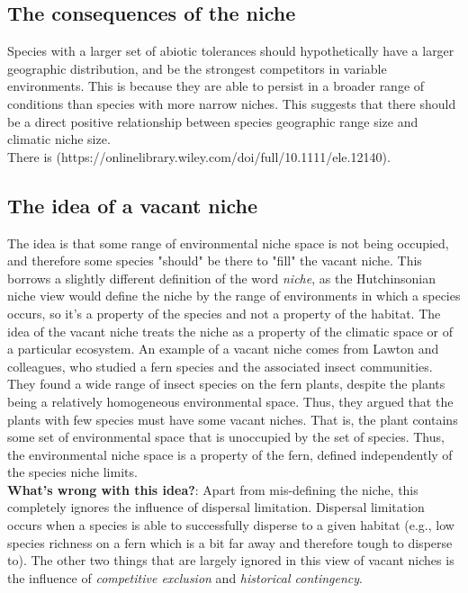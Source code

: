\documentclass[12pt]{article}
\begin{document}
\subsection*{The consequences of the niche}

Species with a larger set of abiotic tolerances should hypothetically have a larger geographic distribution, and be the strongest competitors in variable environments. This is because they are able to persist in a broader range of conditions than species with more narrow niches. This suggests that there should be a direct positive relationship between species geographic range size and climatic niche size. \\ There is (https://onlinelibrary.wiley.com/doi/full/10.1111/ele.12140).



\subsection*{The idea of a vacant niche}
The idea is that some range of environmental niche space is not being occupied, and therefore some species "should" be there to "fill" the vacant niche. This borrows a slightly different definition of the word \textit{niche}, as the Hutchinsonian niche view would define the niche by the range of environments in which a species occurs, so it's a property of the species and not a property of the habitat. The idea of the vacant niche treats the niche as a property of the climatic space or of a particular ecosystem. An example of a vacant niche comes from Lawton and colleagues, who studied a fern species and the associated insect communities. They found a wide range of insect species on the fern plants, despite the plants being a relatively homogeneous environmental space. Thus, they argued that the plants with few species must have some vacant niches. That is, the plant contains some set of environmental space that is unoccupied by the set of species. Thus, the environmental niche space is a property of the fern, defined independently of the species niche limits. \\ 



\textbf{What's wrong with this idea?}: Apart from mis-defining the niche, this completely ignores the influence of dispersal limitation. Dispersal limitation occurs when a species is able to successfully disperse to a given habitat (e.g., low species richness on a fern which is a bit far away and therefore tough to disperse to). The other two things that are largely ignored in this view of vacant niches is the influence of \textit{competitive exclusion} and \textit{historical contingency}. 
\end{document}
